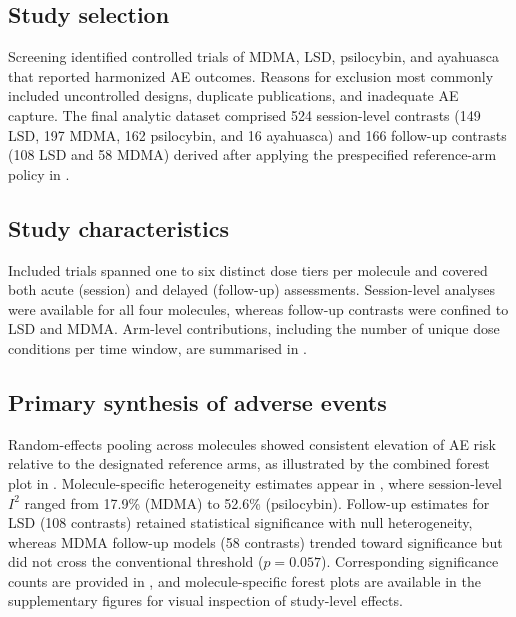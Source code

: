 \subsection{Study selection}
Screening identified controlled trials of MDMA, LSD, psilocybin, and ayahuasca that reported harmonized AE outcomes. Reasons for exclusion most commonly included uncontrolled designs, duplicate publications, and inadequate AE capture. The final analytic dataset comprised 524 session-level contrasts (149 LSD, 197 MDMA, 162 psilocybin, and 16 ayahuasca) and 166 follow-up contrasts (108 LSD and 58 MDMA) derived after applying the prespecified reference-arm policy in .

\subsection{Study characteristics}
Included trials spanned one to six distinct dose tiers per molecule and covered both acute (session) and delayed (follow-up) assessments. Session-level analyses were available for all four molecules, whereas follow-up contrasts were confined to LSD and MDMA. Arm-level contributions, including the number of unique dose conditions per time window, are summarised in .

\subsection{Primary synthesis of adverse events}
Random-effects pooling across molecules showed consistent elevation of AE risk relative to the designated reference arms, as illustrated by the combined forest plot in . Molecule-specific heterogeneity estimates appear in , where session-level $I^2$ ranged from 17.9\% (MDMA) to 52.6\% (psilocybin). Follow-up estimates for LSD (108 contrasts) retained statistical significance with null heterogeneity, whereas MDMA follow-up models (58 contrasts) trended toward significance but did not cross the conventional threshold ($p=0.057$). Corresponding significance counts are provided in , and molecule-specific forest plots are available in the supplementary figures for visual inspection of study-level effects.

